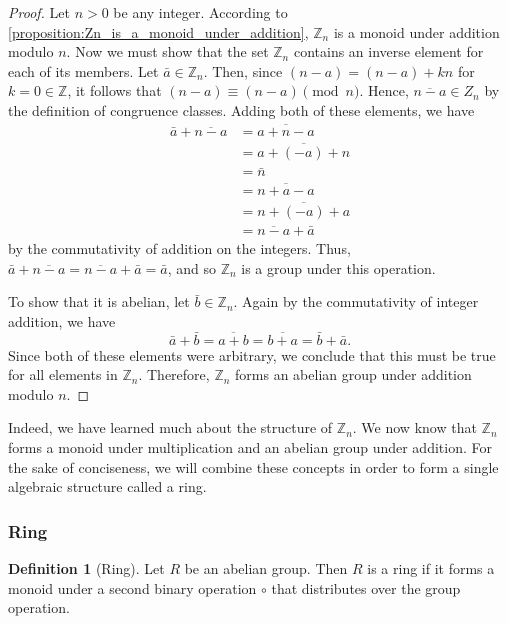 \documentclass[10pt, titlepage]{amsart}
\newcommand\Z{{\mathbb Z}}
\theoremstyle{definition}
\newtheorem{definition}{Definition}[subsection]
\begin{document}
	\begin{proof}
		Let $n>0$ be any integer.
		According to \cref{proposition:Zn_is_a_monoid_under_addition}, $\Z_n$ is a monoid under addition modulo $n$.
		Now we must show that the set $\Z_n$ contains an inverse element for each of its members.
		Let $\bar{a} \in \Z_n$.
		Then, since $(n-a) = (n-a) + kn$ for $k = 0 \in \Z$, it follows that $(n-a) \equiv (n-a) \pmod n$.
		Hence, $\overline{n - a} \in Z_n$ by the definition of congruence classes.
		Adding both of these elements, we have 
		\begin{align*}
			\bar{a} + \overline{n-a} 
			&= \overline{a + n - a} \\
			&= \overline{a + (-a) + n} \\ 
			&= \bar{n} \\
			&= \overline{n + a - a} \\
			&= \overline{n + (-a) + a} \\
			&= \overline{n-a} + \bar{a}
		\end{align*}
		by the commutativity of addition on the integers.
		Thus, $\bar{a} + \overline{n-a} = \overline{n-a} + \bar{a} = \bar{a}$, and so $\Z_n$ is a group under this operation.
		
		To show that it is abelian, let $\bar{b} \in \Z_n$.
		Again by the commutativity of integer addition, we have 
		$$\bar{a}+\bar{b} = \overline{a + b} = \overline{b + a} = \bar{b} + \bar{a}.$$
		Since both of these elements were arbitrary, we conclude that this must be true for all elements in $\Z_n$.
		Therefore, $\Z_n$ forms an abelian group under addition modulo $n$.	
	\end{proof}
	
	Indeed, we have learned much about the structure of $\Z_n$. 
	We now know that $\Z_n$ forms a monoid under multiplication and an abelian group under addition. 
	For the sake of conciseness, we will combine these concepts in order to form a single algebraic structure called a ring.
	
	\subsubsection{Ring}
	
	\begin{definition}[Ring]\label{definition:ring}
		Let $R$ be an abelian group.
		Then $R$ is a ring if it forms a monoid under a second binary operation $\circ$ that distributes over the group operation.
	\end{definition}
	
\end{document}
